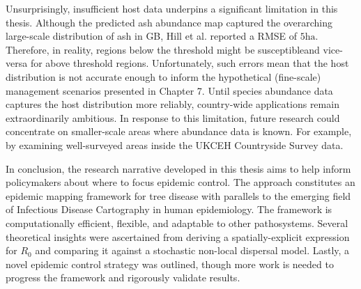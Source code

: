 Unsurprisingly, insufficient host data underpins a significant limitation in this thesis.
Although the predicted ash abundance map captured the overarching large-scale distribution of ash in GB, Hill et al. reported a RMSE of $5\mathrm{ha}$. Therefore, in reality, regions below the threshold might be susceptible\textemdash and vice-versa for above threshold regions.
Unfortunately, such errors mean that the host distribution is not accurate enough to inform the hypothetical (fine-scale) management scenarios presented in Chapter 7. Until species abundance data captures the host distribution more reliably, country-wide applications remain extraordinarily ambitious. In response to this limitation, future research could concentrate on smaller-scale areas where abundance data is known. For example, by examining well-surveyed areas inside the UKCEH Countryside Survey data.

\blindtext

In conclusion, the research narrative developed in this thesis aims to help inform policymakers about where to focus epidemic control.
The approach constitutes an epidemic mapping framework for tree disease with parallels to the emerging field of Infectious Disease Cartography in human epidemiology. 
The framework is computationally efficient, flexible, and adaptable to other pathosystems.
Several theoretical insights were ascertained from deriving a spatially-explicit expression for $R_0$ and comparing it against a stochastic non-local dispersal model. Lastly, a novel epidemic control strategy was outlined, though more work is needed to progress the framework and rigorously validate results.